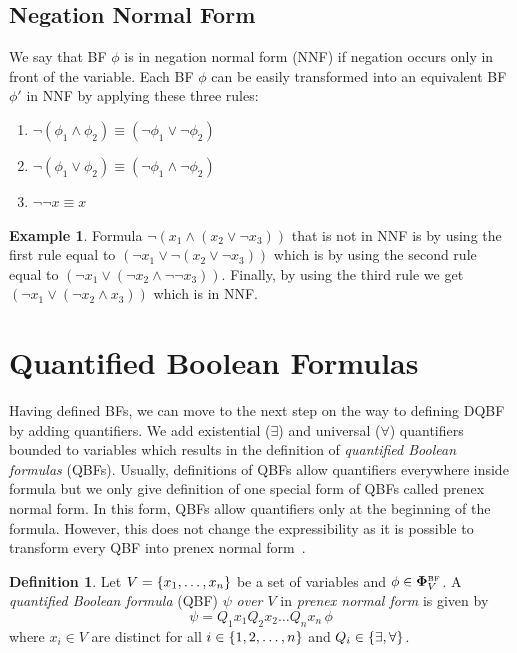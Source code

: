 \documentclass[
  digital, %
  color,
  twoside, %
  table,   %
  nolof,     %
  nolot,     %
]{fithesis3}
\let\setbuilder\set
\newcommand{\simpleset}[1]{\{{#1}\}}
\renewcommand{\set}[1]{\normalexpandarg\IfSubStr{#1}{|}{\setbuilder{#1}}{\simpleset{#1}}}
\theoremstyle{definition}
\newtheorem{definition}{Definition}
\newtheorem{example}{Example}
\theoremstyle{remark}
\newcommand{\BF}[1]{\mathbf{\Phi}_{#1}^{\normalfont{\text{\tiny BF}}}}
\newcommand{\itholds}{\,}
\begin{document}
\subsection{Negation Normal Form}
\label{sec:BF:NNF}
We say that BF $\phi$ is in negation normal form (NNF) if negation occurs only in front of the variable. Each BF $\phi$ can be easily transformed into an equivalent BF $\phi'$ in NNF by applying these three rules:
\begin{enumerate}
    \item $\neg(\phi_1 \land \phi_2) \equiv (\neg\phi_1 \lor \neg\phi_2)$ 
    \item $\neg(\phi_1 \lor \phi_2) \equiv (\neg\phi_1 \land \neg\phi_2)$
    \item $\neg\neg x \equiv x$
\end{enumerate}
\begin{example}
Formula $\neg (x_1 \land (x_2 \lor \neg x_3))$ that is not in NNF is by using the first rule equal to $(\neg x_1 \lor \neg(x_2 \lor \neg x_3))$ which is by using the second rule equal to $(\neg x_1 \lor (\neg x_2 \land \neg\neg x_3))$. Finally, by using the third rule we get $(\neg x_1 \lor (\neg x_2 \land x_3))$ which is in NNF.
\end{example}

\section{Quantified Boolean Formulas}
Having defined BFs, we can move to the next step on the way to defining DQBF by adding quantifiers. We add existential (${\exists}$) and universal (${\forall}$) quantifiers bounded to variables which results in the definition of \emph{quantified Boolean formulas} (QBFs). Usually, definitions of QBFs allow quantifiers everywhere inside formula but we only give definition of one special form of QBFs called prenex normal form. In this form, QBFs allow quantifiers only at the beginning of the formula. However, this does not change the expressibility as it is possible to transform every QBF into prenex normal form~\cite{prenexingQBFs}.

\begin{definition}
Let $V = \set{x_1,\dots,x_n}$ be a set of variables and $\phi \in \BF{V}$. A \emph{quantified Boolean formula} (QBF) $\psi$ \emph{over $V$} in \emph{prenex normal form} is given by
\[\psi = Q_1 x_1 Q_2 x_2 \dots Q_n x_n \itholds \phi\]
where $x_i \in V$ are distinct for all $i \in \set{1,2,\dots,n}$ and $Q_i \in \set{{\exists}, {\forall}}$.
\label{def:QBF}
\end{definition}
\end{document}
